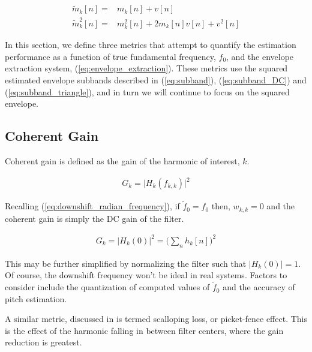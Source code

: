 \documentclass [11pt, proquest,oneside] {ganter_thesis}[2015/03/03]
\begin{document}
\begin{align}
\tilde{m}_k[n] =& m_k[n] + v[n] \\
\tilde{m}_k^2[n] =& m_k^2[n] + 2m_k[n]v[n] + v^2[n]
\end{align}

In this section, we define three metrics that attempt to quantify the estimation performance as a function of true fundamental frequency, $f_0$, and the envelope extraction system, (\ref{eq:envelope_extraction}).  These metrics use the squared estimated envelope subbands described in (\ref{eq:subband}), (\ref{eq:subband_DC}) and (\ref{eq:subband_triangle}), and in turn we will continue to focus on the squared envelope.

\subsection{Coherent Gain}

Coherent gain is defined as the gain of the harmonic of interest, $k$.

\begin{align}
G_k = \Big| H_k(f_{k,k}) \Big|^2
\end{align}

Recalling (\ref{eq:downshift_radian_frequency}), if $\tilde{f}_0 = f_0$ then, $w_{k,k} = 0$ and the coherent gain is simply the DC gain of the filter.

\begin{align}
G_k = \Big| H_k(0) \Big|^2 = \Big( \sum_n h_k[n] \Big)^2
\end{align}

This may be further simplified by normalizing the filter such that $\Big| H_k(0) \Big| = 1$.  Of course, the downshift frequency won't be ideal in real systems.  Factors to consider include the quantization of computed values of $\tilde{f}_0$ and the accuracy of pitch estimation.

A similar metric, discussed in \cite{harris1978use} is termed scalloping loss, or picket-fence effect.  This is the effect of the harmonic falling in between filter centers, where the gain reduction is greatest.


\end{document}
